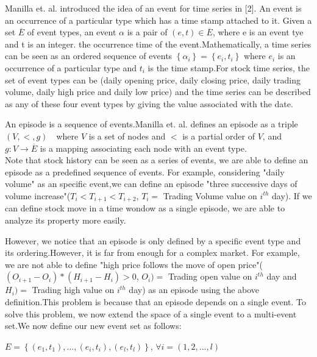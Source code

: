 \documentclass[10pt, conference, compsocconf]{IEEEtran}
\begin{document}
Manilla et. al. introduced the idea of an event for time series in [2]. An event is an occurrence of a particular type which has a time stamp attached to it. Given a set $\overline{E}$ of event types, an event $\alpha$ is a pair of $\left ( e,t \right )\in \overline{E}$, where e is an event tye and t is an integer. the occurrence time of the event.Mathematically, a time series can be seen as an ordered sequence of events $\left \{ \alpha_{i}  \right \}=\left \{ e_{i},t_{i} \right \}$ where $e_{i}$ is an occurrence of a particular type and $t_{i}$ is the time stamp.For stock time series, the set of event types can be (daily opening price, daily closing price, daily trading volume, daily high price and daily low price) and the time series can be described as any of these four event types by giving the value associated with the date. \\
\par 
An episode is a sequence of events.Manilla et. al. defines an episode as a triple $\left (V,< ,g  \right )$　where $V$ is a set of nodes and $<$ is a partial order of $V$, and $g:V\rightarrow \overline{E}$ is a mapping associating each node with an event type.\\
Note that stock history can be seen as a series of events, we are able to define an episode as a predefined sequence of events. For example, considering "daily volume" as an specific event,we can define an episode "three successive days of volume increase"($T_{i}<T_{i+1}<T_{i+2}$, $T_{i}=$ Trading Volume value on $i^{th}$ day). If we can define stock move in a time wondow as a single episode, we are able to analyze its property more easily.
\par
However, we notice that an episode is only defined by a specific event type and its ordering.However, it is far from enough for a complex market. For example, we are not able to define "high price follows the move of open price"($(O_{i+1}-O_{i})*(H_{i+1}-H_{i})>0$, $O_{i})=$ Trading open value on $i^{th}$ day and $H_{i})=$ Trading high value on $i^{th}$ day) as an episode using the above definition.This problem is because that an episode depends on a single event. To solve this problem, we now extend the space of a single event to a multi-event set.We now define our new event set as follows:
\par
$E=\left \{ (e_{1},t_{1}),...,(e_{i},t_{i}),(e_{l},t_{l}) \right \}$, $\forall i=(1,2,...,l)$
\par
\end{document}
